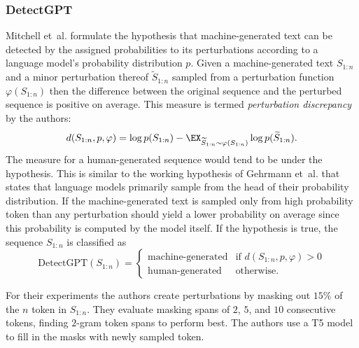     \subsubsection{DetectGPT}
    \label{sec:detectgpt}
    Mitchell et~al. \cite{mitchell2023detectgpt} formulate the hypothesis that machine-generated text can be detected by the assigned probabilities to its perturbations according to a language model's probability distribution $p$. 
    Given a machine-generated text $S_{1:n}$ and a minor perturbation thereof $\widetilde{S}_{1:n}$ sampled from a perturbation function $\varphi(S_{1:n})$ then the difference between the original sequence and the perturbed sequence is positive on average.
    This measure is termed \emph{perturbation discrepancy} by the authors:
    \begin{equation}
        d(S_{1:n}, p, \varphi) = \log p(S_{1:n}) - \EX_{\widetilde{S}_{1:n} \sim \varphi(S_{1:n})} \log p(\widetilde{S}_{1:n})\text{.}
    \end{equation}
    The measure for a human-generated sequence would tend to be under the hypothesis.
    This is similar to the working hypothesis of Gehrmann et~al. \cite{gehrmann2019gltr} that states that language models primarily sample from the head of their probability distribution.
    If the machine-generated text is sampled only from high probability token than any perturbation should yield a lower probability on average since this probability is computed by the model itself. 
    If the hypothesis is true, the sequence $S_{1:n}$ is classified as
    \begin{equation}
        \text{DetectGPT}(S_{1:n}) =
        \begin{cases}
            \text{machine-generated} & \text{if } d(S_{1:n},p,\varphi) > 0 \\
            \text{human-generated} & \text{otherwise.}
        \end{cases}
    \end{equation}

    For their experiments the authors create perturbations by masking out $15\%$ of the $n$ token in $S_{1:n}$.
    They evaluate masking spans of $2$, $5$, and $10$ consecutive tokens, finding $2$-gram token spans to perform best.
    The authors use a T5 \cite{raffel2023exploring} model to fill in the masks with newly sampled token.

